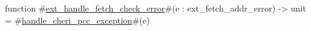 function #\hyperref[sailRISCVzextzyhandlezyfetchzycheckzyerror]{ext\_handle\_fetch\_check\_error}#(e : ext_fetch_addr_error) -> unit =
  #\hyperref[sailRISCVzhandlezycherizypcczyexception]{handle\_cheri\_pcc\_exception}#(e)
